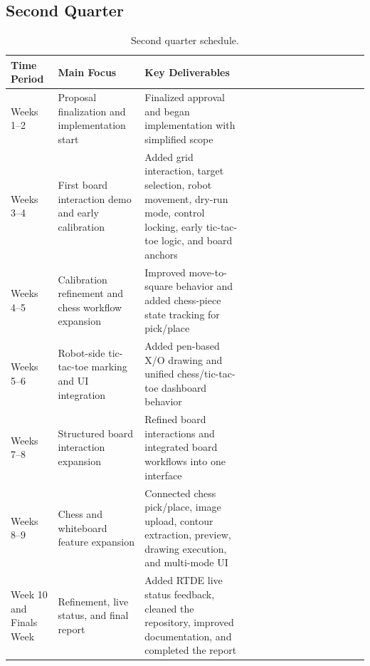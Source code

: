 \documentclass[12pt]{article}
\newcommand{\tablegridon}{\arrayrulecolor{black!35}}
\newcommand{\tablegridoff}{\arrayrulecolor{black}}
\newcommand{\tabrowsep}{\\[0.12em]\hline}
\begin{document}
\subsection{Second Quarter}
\begin{table}[H]
\centering
\caption{Second quarter schedule.}
\label{tab:second-quarter}
\small
\tablegridon
\begin{tabularx}{\textwidth}{|L{2.8cm}|L{3.4cm}|Y|}
\toprule
Time Period & Main Focus & Key Deliverables \\
\midrule
Weeks 1--2 & Proposal finalization and implementation start & Finalized approval and began implementation with simplified scope \tabrowsep
Weeks 3--4 & First board interaction demo and early calibration & Added grid interaction, target selection, robot movement, dry-run mode, control locking, early tic-tac-toe logic, and board anchors \tabrowsep
Weeks 4--5 & Calibration refinement and chess workflow expansion & Improved move-to-square behavior and added chess-piece state tracking for pick/place \tabrowsep
Weeks 5--6 & Robot-side tic-tac-toe marking and UI integration & Added pen-based X/O drawing and unified chess/tic-tac-toe dashboard behavior \tabrowsep
Weeks 7--8 & Structured board interaction expansion & Refined board interactions and integrated board workflows into one interface \tabrowsep
Weeks 8--9 & Chess and whiteboard feature expansion & Connected chess pick/place, image upload, contour extraction, preview, drawing execution, and multi-mode UI \tabrowsep
Week 10 and Finals Week & Refinement, live status, and final report & Added RTDE live status feedback, cleaned the repository, improved documentation, and completed the report \\
\bottomrule
\end{tabularx}
\tablegridoff
\end{table}
\end{document}
